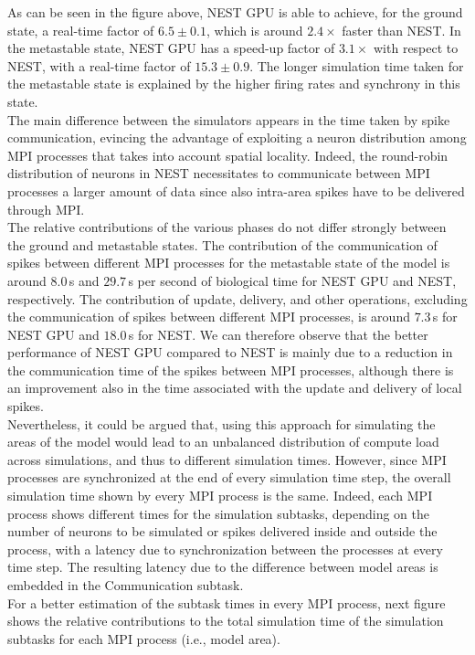 \documentclass[a4paper, 12pt, twoside, openright]{book}
\begin{document}
As can be seen in the figure above, NEST GPU is able to achieve, for the ground state, a real-time factor of $6.5\pm 0.1$, which is around $2.4\times$ faster than NEST. In the metastable state, NEST GPU has a speed-up factor of $3.1\times$ with respect to NEST, with a real-time factor of $15.3\pm 0.9$. The longer simulation time taken for the metastable state is explained by the higher firing rates and synchrony in this state.\\
The main difference between the simulators appears in the time taken by spike communication, evincing the advantage of exploiting a neuron distribution among MPI processes that takes into account spatial locality. Indeed, the round-robin distribution of neurons in NEST necessitates to communicate between MPI processes a larger amount of data since also intra-area spikes have to be delivered through MPI.\\
The relative contributions of the various phases do not differ strongly between the ground and metastable states. The contribution of the communication of spikes between different MPI processes for the metastable state of the model is around $8.0$\,s and $29.7$\,s per second of biological time for NEST GPU and NEST, respectively. The contribution of update, delivery, and other operations, excluding the communication of spikes between different MPI processes, is around $7.3$\,s for NEST GPU and $18.0$\,s for NEST. We can therefore observe that the better performance of NEST GPU compared to NEST is mainly due to a reduction in the communication time of the spikes between MPI processes, although there is an improvement also in the time associated with the update and delivery of local spikes.\\
Nevertheless, it could be argued that, using this approach for simulating the areas of the model would lead to an unbalanced distribution of compute load across simulations, and thus to different simulation times. However, since MPI processes are synchronized at the end of every simulation time step, the overall simulation time shown by every MPI process is the same. Indeed, each MPI process shows different times for the simulation subtasks, depending on the number of neurons to be simulated or spikes delivered inside and outside the process, with a latency due to synchronization between the processes at every time step. The resulting latency due to the difference between model areas is embedded in the Communication subtask.\\
For a better estimation of the subtask times in every MPI process, next figure shows the relative contributions to the total simulation time of the simulation subtasks for each MPI process (i.e., model area).
\end{document}
